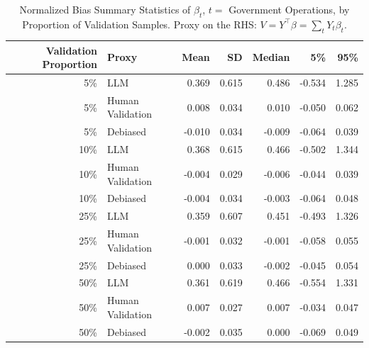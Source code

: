 \begin{table}

\caption{\label{tab:unnamed-chunk-1}Normalized Bias Summary Statistics of $\beta_{t}$, $t=$ Government Operations, by Proportion of Validation Samples.
      Proxy on the RHS: $V = Y^\top \beta = \sum_{t} Y_t \beta_t$.}
\centering
\begin{tabular}[t]{rlrrrrr}
\toprule
Validation Proportion & Proxy & Mean & SD & Median & 5\% & 95\%\\
\midrule
5\% & LLM & 0.369 & 0.615 & 0.486 & -0.534 & 1.285\\
5\% & Human Validation & 0.008 & 0.034 & 0.010 & -0.050 & 0.062\\
5\% & Debiased & -0.010 & 0.034 & -0.009 & -0.064 & 0.039\\
10\% & LLM & 0.368 & 0.615 & 0.466 & -0.502 & 1.344\\
10\% & Human Validation & -0.004 & 0.029 & -0.006 & -0.044 & 0.039\\
10\% & Debiased & -0.004 & 0.034 & -0.003 & -0.064 & 0.048\\
25\% & LLM & 0.359 & 0.607 & 0.451 & -0.493 & 1.326\\
25\% & Human Validation & -0.001 & 0.032 & -0.001 & -0.058 & 0.055\\
25\% & Debiased & 0.000 & 0.033 & -0.002 & -0.045 & 0.054\\
50\% & LLM & 0.361 & 0.619 & 0.466 & -0.554 & 1.331\\
50\% & Human Validation & 0.007 & 0.027 & 0.007 & -0.034 & 0.047\\
50\% & Debiased & -0.002 & 0.035 & 0.000 & -0.069 & 0.049\\
\bottomrule
\end{tabular}
\end{table}
